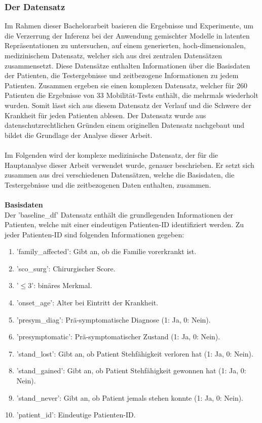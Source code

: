 \documentclass[%
thesis=student,%
coverpage=false,%
titlepage=false,%
headmarks=true, %
german,%
font=libertine, %
math=newpxtx, %
BCOR=5mm,%
coverBCOR=11mm%
]{tumbook}
\theoremstyle{break}
\begin{document}
\subsubsection{Der Datensatz}
Im Rahmen dieser Bachelorarbeit basieren die Ergebnisse und Experimente, um die Verzerrung der Inferenz bei der Anwendung gemischter Modelle in latenten Repräsentationen zu untersuchen, auf einem generierten, hoch-dimensionalen, medizinischem Datensatz, welcher sich aus drei zentralen Datensätzen zusammensetzt. Diese Datensätze enthalten Informationen über die Basisdaten der Patienten, die Testergebnisse und zeitbezogene Informationen zu jedem Patienten. Zusammen ergeben sie einen komplexen Datensatz, welcher für 260 Patienten die Ergebnisse von 33 Mobilität-Tests enthält, die mehrmals wiederholt wurden. Somit lässt sich aus diesem Datensatz der Verlauf und die Schwere der Krankheit für jeden Patienten ablesen.  Der Datensatz wurde aus datenschutzrechtlichen Gründen einem originellen Datensatz nachgebaut und bildet die Grundlage der Analyse dieser Arbeit.\\
\\
Im Folgenden wird der komplexe medizinische Datensatz, der für die Hauptanalyse dieser Arbeit verwendet wurde, genauer beschrieben. Er setzt sich zusammen aus drei verschiedenen Datensätzen, welche die Basisdaten, die Testergebnisse und die zeitbezogenen Daten enthalten, zusammen. \\
\\
\textbf{Basisdaten}\\
Der 'baseline\_df' Datensatz enthält die grundlegenden Informationen der Patienten, welche mit einer eindeutigen Patienten-ID identifiziert werden. Zu jeder Patienten-ID sind folgenden Informationen gegeben: 
\begin{enumerate}
	\item 'family\_affected': Gibt an, ob die Familie vorerkrankt ist.
	\item 'sco\_surg': Chirurgischer Score.
	\item  '$\leq3$': binäres Merkmal.
	\item 'onset\_age': Alter bei Eintritt der Krankheit.
	\item 'presym\_diag': Prä-symptomatische Diagnose (1: Ja, 0: Nein).
	\item 'presymptomatic': Prä-symptomatischer Zustand (1: Ja, 0: Nein).
	\item 'stand\_lost': Gibt an, ob Patient Stehfähigkeit verloren hat (1: Ja, 0: Nein).
	\item 'stand\_gained': Gibt an, ob Patient Stehfähigkeit gewonnen hat (1: Ja, 0: Nein).
	\item 'stand\_never': Gibt an, ob Patient jemals stehen konnte (1: Ja, 0: Nein).
	\item 'patient\_id': Eindeutige Patienten-ID.
\end{enumerate}
\end{document}

